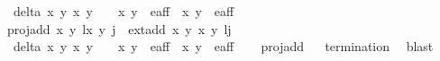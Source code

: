 \begin{isabellebody}
\ \ {\isachardoublequoteopen}delta\ x\ y\ x\ y\ {\isasymnoteq}\ {}\ {\isasymand}\ {\isacharparenleft}x\ y\ {\isasymin}\ e{\isacharprime}{\isacharunderscore}aff\ {\isasymand}\ {\isacharparenleft}x\ y\ {\isasymin}\ e{\isacharprime}{\isacharunderscore}aff{\isachardoublequoteclose}\ \isanewline
{\isacharbar}\ {\isachardoublequoteopen}proj{\isacharunderscore}add\ {\isacharparenleft}{\isacharparenleft}{\isacharparenleft}x\ y\ l{\isacharparenright}{\isacharcomma}{\isacharparenleft}{\isacharparenleft}x\ y\ j{\isacharparenright}{\isacharparenright}\ {\isacharequal}\ {\isacharparenleft}ext{\isacharunderscore}add\ {\isacharparenleft}x\ y\ {\isacharparenleft}x\ y\ l{\isacharplus}j{\isacharparenright}{\isachardoublequoteclose}\isanewline
\ \ {\isachardoublequoteopen}delta{\isacharprime}\ x\ y\ x\ y\ {\isasymnoteq}\ {}\ {\isasymand}\ {\isacharparenleft}x\ y\ {\isasymin}\ e{\isacharprime}{\isacharunderscore}aff\ {\isasymand}\ {\isacharparenleft}x\ y\ {\isasymin}\ e{\isacharprime}{\isacharunderscore}aff{\isachardoublequoteclose}\isanewline
%
\isadelimproof
\ \ %
\endisadelimproof
%
\isatagproof
{}\isamarkupfalse%
%
\endisatagproof
{\isafoldproof}%
%
\isadelimproof
\isanewline
%
\endisadelimproof
\isanewline
{}\isamarkupfalse%
\ proj{\isacharunderscore}add%
\isadelimproof
\ %
\endisadelimproof
%
\isatagproof
{}\isamarkupfalse%
\ {\isachardoublequoteopen}termination{\isachardoublequoteclose}\ \isamarkupfalse%
\ blast%
\endisatagproof
{\isafoldproof}%
%
\isadelimproof
%
\endisadelimproof
\isanewline
\isanewline
{}\isamarkupfalse%

\end{isabellebody}
